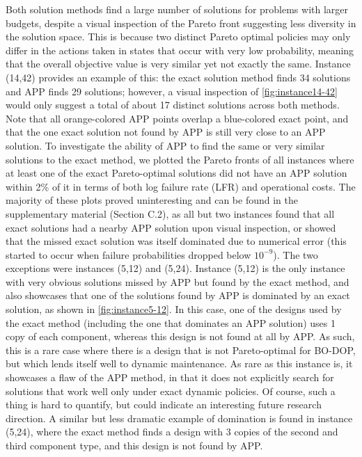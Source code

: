 \documentclass[11pt,authoryear,a4paper]{article}
\theoremstyle{definition}
\begin{document}
{Both solution methods find a large number of solutions for problems with larger budgets, despite a visual inspection of the Pareto front suggesting less diversity in the solution space. This is because two distinct Pareto optimal policies may only differ in the actions taken in states that occur with very low probability, meaning that the overall objective value is very similar yet not exactly the same. Instance (14,42) provides an example of this: the exact solution method finds 34 solutions and APP finds 29 solutions; however, a visual inspection of \autoref{fig:instance14-42} would only suggest a total of about 17 distinct solutions across both methods. Note that all orange-colored APP points overlap a blue-colored exact point, and that the one exact solution not found by APP is still very close to an APP solution. To investigate the ability of APP to find the same or very similar solutions to the exact method, we plotted the Pareto fronts of all instances where at least one of the exact Pareto-optimal solutions did not have an APP solution within 2\% of it in terms of both log failure rate (LFR) and operational costs. The majority of these plots proved uninteresting and can be found in the supplementary material (Section C.2), as all but two instances found that all exact solutions had a nearby APP solution upon visual inspection, or showed that the missed exact solution was itself dominated due to numerical error (this started to occur when failure probabilities dropped below $10^{-9}$). The two exceptions were instances (5,12) and (5,24). Instance (5,12) is the only instance with very obvious solutions missed by APP but found by the exact method, and also showcases that one of the solutions found by APP is dominated by an exact solution, as shown in \autoref{fig:instance5-12}. In this case, one of the designs used by the exact method (including the one that dominates an APP solution) uses 1 copy of each component, whereas this design is not found at all by APP. As such, this is a rare case where there is a design that is not Pareto-optimal for BO-DOP, but which lends itself well to dynamic maintenance. As rare as this instance is, it showcases a flaw of the APP method, in that it does not explicitly search for solutions that work well only under exact dynamic policies. Of course, such a thing is hard to quantify, but could indicate an interesting future research direction. A similar but less dramatic example of domination is found in instance (5,24), where the exact method finds a design with 3 copies of the second and third component type, and this design is not found by APP.

}
\end{document}
